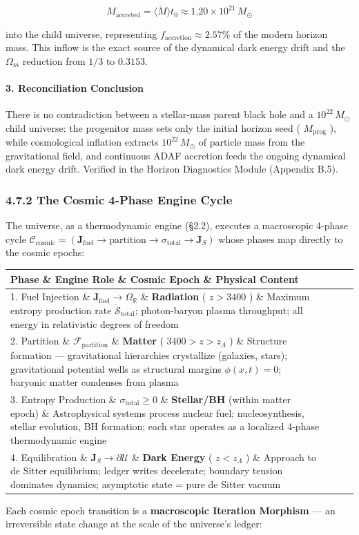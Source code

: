 \documentclass[11pt,a4paper]{article}
\theoremstyle{definition}\newtheorem{definition}{Definition}
\theoremstyle{remark}\newtheorem{remark}{Remark}
\begin{document}
\begin{equation}
M_{\text{accreted}} = \langle\dot{M}\rangle t_0 \approx 1.20 \times 10^{21} \, M_\odot
\end{equation}


into the child universe, representing $f_{\text{accretion}} \approx 2.57\%$ of the modern horizon mass. This inflow is the exact source of the dynamical dark energy drift and the $\Omega_m$ reduction from $1/3$ to $0.3153$.
\paragraph{3. Reconciliation Conclusion}

There is no contradiction between a stellar-mass parent black hole and a $10^{22} \, M_\odot$ child universe: the progenitor mass sets only the initial horizon seed ( $M_{\text{prog}}$ ), while cosmological inflation extracts $10^{22} \, M_\odot$ of particle mass from the gravitational field, and continuous ADAF accretion feeds the ongoing dynamical dark energy drift. Verified in the Horizon Diagnostics Module (Appendix B.5).
\subsubsection{4.7.2 The Cosmic 4-Phase Engine Cycle}

The universe, as a thermodynamic engine (§2.2), executes a macroscopic 4-phase cycle $\mathcal{C}_{\text{cosmic}} = (\mathbf{J}_{\text{fuel}} \to \text{partition} \to \sigma_{\text{total}} \to \mathbf{J}_S)$ whose phases map directly to the cosmic epochs:

\begin{longtable}{llll}
\hline
Phase \& Engine Role \& Cosmic Epoch \& Physical Content \\
\hline
1. Fuel Injection \& $\mathbf{J}_{\text{fuel}} \to \Omega_{\mathbb{R}}$ \& \textbf{Radiation} ( $z > 3400$ ) \& Maximum entropy production rate $\dot{\mathcal{S}}_{\text{total}}$; photon-baryon plasma throughput; all energy in relativistic degrees of freedom \\
2. Partition \& $\mathcal{F}_{\text{partition}}$ \& \textbf{Matter} ( $3400 > z > z_{\Lambda}$ ) \& Structure formation — gravitational hierarchies crystallize (galaxies, stars); gravitational potential wells as structural margins $\phi(x,t) = 0$; baryonic matter condenses from plasma \\
3. Entropy Production \& $\sigma_{\text{total}} \ge 0$ \& \textbf{Stellar/BH} (within matter epoch) \& Astrophysical systems process nuclear fuel; nucleosynthesis, stellar evolution, BH formation; each star operates as a localized 4-phase thermodynamic engine \\
4. Equilibration \& $\mathbf{J}_S \to \partial\mathcal{U}$ \& \textbf{Dark Energy} ( $z < z_\Lambda$ ) \& Approach to de Sitter equilibrium; ledger writes decelerate; boundary tension dominates dynamics; asymptotic state = pure de Sitter vacuum \\
\hline
\end{longtable}
Each cosmic epoch transition is a \textbf{macroscopic Iteration Morphism} — an irreversible state change at the scale of the universe's ledger:
\end{document}
